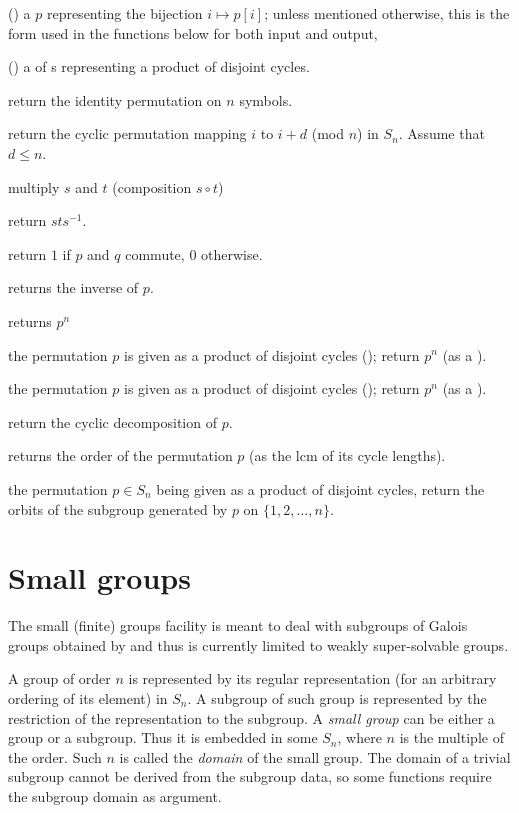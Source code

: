 \item () a  $p$ representing the bijection $i\mapsto
p[i]$; unless mentioned otherwise, this is the form used in the functions
below for both input and output,

\item () a  of s representing a product of
disjoint cycles.

 return the identity permutation on $n$
symbols.

 return the cyclic permutation mapping
$i$ to $i+d$ (mod $n$) in $S_n$. Assume that $d \leq n$.

 multiply $s$ and $t$ (composition $s\circ t$)

 return $sts^{-1}$.

 return $1$ if $p$ and $q$ commute, 0
otherwise.

 returns the inverse of $p$.

 returns $p^n$

 the permutation $p$ is given as
a product of disjoint cycles (); return $p^n$ (as a ).

 the permutation $p$ is given as
a product of disjoint cycles (); return $p^n$ (as a ).

 return the cyclic decomposition of $p$.

 returns the order of the permutation $p$
(as the lcm of its cycle lengths).

 the permutation $p\in S_n$ being
given as a product of disjoint cycles, return the orbits of the subgroup
generated by $p$ on $\{1,2,\ldots,n\}$.

\section{Small groups}

The small (finite) groups facility is meant to deal with subgroups of Galois
groups obtained by  and thus is currently limited to weakly
super-solvable groups.

A group  of order $n$ is represented by its regular representation
(for an arbitrary ordering of its element) in $S_n$.  A subgroup of such group
is represented by the restriction of the representation to the subgroup.
A \emph{small group} can be either a group or a subgroup. Thus it is embedded
in some $S_n$, where $n$ is the multiple of the order. Such $n$ is called the
\emph{domain} of the small group. The domain of a trivial subgroup cannot be
derived from the subgroup data, so some functions require the subgroup domain
as argument.

